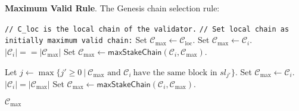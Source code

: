 \bigbreak
\bigbreak
\noindent
{}
\textbf{Maximum Valid Rule}.\label{apndx:max-valid-rule}
The Genesis chain selection rule:
\begin{algo}
    \caption{${\textsf{maxValidChain}(\mathcal{C}_{\text{loc}}, \{\mathcal{C}_i\}_{i=1}^N, K_{\text{f}}, K_{\text{g}})}$}
    \begin{algorithmic}[1]
        \noindent
        \lstinline|// C_loc is the local chain of the validator.|
        \noindent
        \lstinline|// Set local chain as initially maximum valid chain:|
        \State Set ${\mathcal{C}_{\max} \leftarrow \mathcal{C}_{\text{loc}}}$.
                    \State Set ${\mathcal{C}_{\max} \leftarrow \mathcal{C}_{i}}$.
                \ElsIf
                        {$|\mathcal{C}_i| == |\mathcal{C}_{\max}|$}
                    \State Set ${\mathcal{C}_{\max} \leftarrow \textsf{maxStakeChain}(\mathcal{C}_{i}, \mathcal{C}_{\max})}$.

                \EndIf
            \Else

                \State Let ${j  \leftarrow \max \{j' \geq 0 \ |\  \mathcal{C}_{\max} \text{ and } \mathcal{C}_{i} \
                \text{have the same block in } sl_{j'}\}}$.
                    \State Set ${\mathcal{C}_{\max} \leftarrow \mathcal{C}_{i}}$.
                \ElsIf
                        {$|\mathcal{C}_i| = |\mathcal{C}_{\max}|$}
                    \State Set ${\mathcal{C}_{\max} \leftarrow \textsf{maxStakeChain}(\mathcal{C}_{i}, \mathcal{C}_{\max})}$.
                \EndIf
            \EndIf

        \EndFor
        \State \Return ${\mathcal{C}_{\max}}$
    \end{algorithmic}\label{alg:max-valid-rule}
\end{algo}

